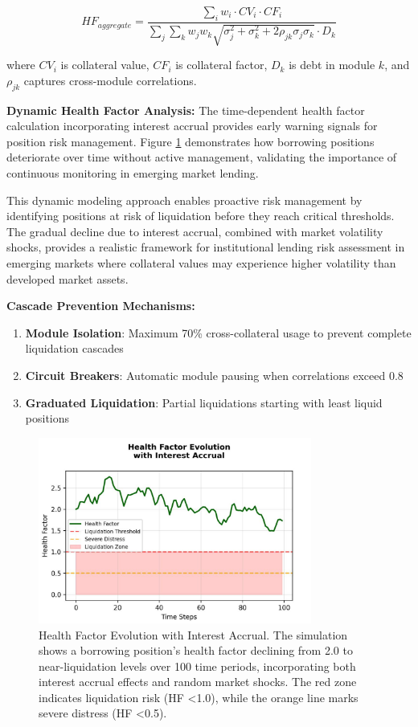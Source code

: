 \documentclass[12pt]{article}
\begin{document}
\begin{equation}
HF_{aggregate} = \frac{\sum_i w_i \cdot CV_i \cdot CF_i}{\sum_j \sum_k w_j w_k \sqrt{\sigma_j^2 + \sigma_k^2 + 2\rho_{jk}\sigma_j\sigma_k} \cdot D_k}
\end{equation}

where $CV_i$ is collateral value, $CF_i$ is collateral factor, $D_k$ is debt in module $k$, and $\rho_{jk}$ captures cross-module correlations.

\textbf{Dynamic Health Factor Analysis:}
The time-dependent health factor calculation incorporating interest accrual provides early warning signals for position risk management. Figure \ref{fig:health_factor_evolution} demonstrates how borrowing positions deteriorate over time without active management, validating the importance of continuous monitoring in emerging market lending.

This dynamic modeling approach enables proactive risk management by identifying positions at risk of liquidation before they reach critical thresholds. The gradual decline due to interest accrual, combined with market volatility shocks, provides a realistic framework for institutional lending risk assessment in emerging markets where collateral values may experience higher volatility than developed market assets.

\textbf{Cascade Prevention Mechanisms:}
\begin{enumerate}
\item \textbf{Module Isolation}: Maximum 70\% cross-collateral usage to prevent complete liquidation cascades
\item \textbf{Circuit Breakers}: Automatic module pausing when correlations exceed 0.8
\item \textbf{Graduated Liquidation}: Partial liquidations starting with least liquid positions
\end{enumerate}

\begin{figure}[h]
    \centering
    \includegraphics[width=0.8\textwidth]{health_factor_evaluation.jpeg}
    \caption{Health Factor Evolution with Interest Accrual. The simulation shows a borrowing position's health factor declining from 2.0 to near-liquidation levels over 100 time periods, incorporating both interest accrual effects and random market shocks. The red zone indicates liquidation risk (HF \textless  1.0), while the orange line marks severe distress (HF \textless  0.5).}
    \label{fig:health_factor_evolution}
\end{figure}
\end{document}
